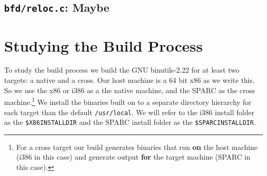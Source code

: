 \subsection{\texttt{bfd/reloc.c}: Maybe}
\label{sec:bfd:reloc.c}

\section{Studying the Build Process}
\label{sec:build:study}

To study the build process we build the GNU binutils-2.22 for at least
two targets: a native  and a cross.  Our host machine is  a 64 bit x86
as we write this.  So we use  the x86 or i386 as a the native machine,
and the  SPARC as the  cross machine.\footnote{For a cross  target our
  build generates binaries that run \textbf{on} the host machine (i386
  in this  case) and generate  output \textbf{for} the  target machine
  (SPARC  in this  case).}   We install  the  binaries built  on to  a
separate  directory  hierarchy  for   each  target  than  the  default
\texttt{/usr/local}.  We will refer to  the i386 install folder as the
\texttt{\$X86INSTALLDIR}   and  the  SPARC   install  folder   as  the
\texttt{\$SPARCINSTALLDIR}.

